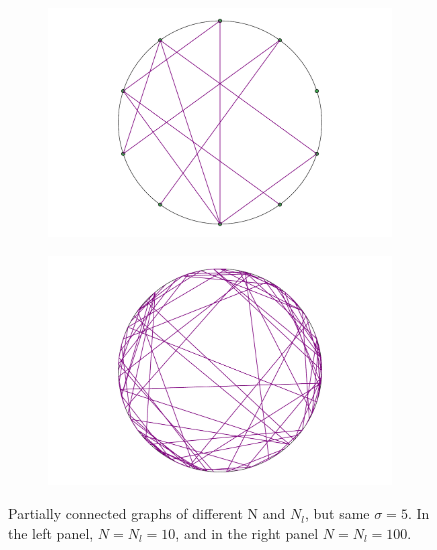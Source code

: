 \begin{figure}[t]
	\begin{subfigure}{0.5\textwidth}
	\centering
	\includegraphics[width=\textwidth]{figures/partially-connected-graph.pdf}
\end{subfigure}
	\begin{subfigure}{0.5\textwidth}
	\centering
	\includegraphics[width=\textwidth]{figures/partially-connected-graph-many-points-nPoints-100-nBonds-100-sigma-5.pdf}
\end{subfigure}
	\caption{Partially connected graphs of different N and $N_l$, but same $\sigma=5$. In the left panel, $N=N_l=10$, and in the right panel $N=N_l=100$.}
	\label{fig:a-partially-connected-graph}
\end{figure}

